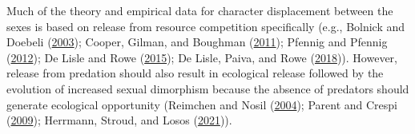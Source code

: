 \documentclass[
  12pt,
]{article}
\begin{document}
Much of the theory and empirical data for character displacement between
the sexes is based on release from resource competition specifically
(e.g., Bolnick and Doebeli
(\protect\hyperlink{ref-BolnickandDoebeli2003}{2003}); Cooper, Gilman,
and Boughman (\protect\hyperlink{ref-Cooperetal2011}{2011}); Pfennig and
Pfennig (\protect\hyperlink{ref-PfennigandPfennig2012}{2012}); De Lisle
and Rowe (\protect\hyperlink{ref-DeLisleandRowe2015}{2015}); De Lisle,
Paiva, and Rowe (\protect\hyperlink{ref-DeLisleetal2018}{2018})).
However, release from predation should also result in ecological release
followed by the evolution of increased sexual dimorphism because the
absence of predators should generate ecological opportunity (Reimchen
and Nosil (\protect\hyperlink{ref-ReimchenandNosil2004}{2004}); Parent
and Crespi (\protect\hyperlink{ref-ParentandCrespi2009}{2009});
Herrmann, Stroud, and Losos
(\protect\hyperlink{ref-Herrmannetal2021}{2021})).
\end{document}
